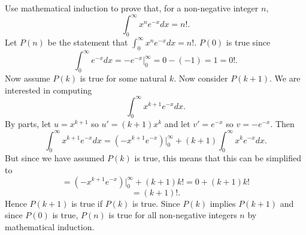 Use mathematical induction to prove that, for a non-negative integer $n$, 
\[
\int^\infty_0 x^ne^{-x} dx = n!.
\]
\newline
Let $P(n)$ be the statement that $\int^{\infty}_0 x^ne^{-x}dx = n!$. $P(0)$ is true since 
\[
\int^\infty_0 e^{-x} dx = -e^{-x}\rvert^\infty_0 = 0 - (-1) = 1 = 0!.
\]
Now assume $P(k)$ is true for some natural $k$. Now consider $P(k+1)$. We are interested in computing
\[
\int^{\infty}_0 x^{k+1}e^{-x}dx.
\]
By parts, let $u = x^{k+1}$ so $u' = (k+1)x^k$ and let $v' = e^{-x}$ so $v = -e^{-x}$. Then
\[
\int^{\infty}_0 x^{k+1}e^{-x}dx = (-x^{k+1}e^{-x})\rvert^\infty_0 + (k+1)\int^\infty_0 x^ke^{-x}dx.
\]
But since we have assumed $P(k)$ is true, this means that this can be simplified to
\[
= (-x^{k+1}e^{-x})\rvert^\infty_0 + (k+1)k! = 0 + (k+1)k!
\]
\[
= (k+1)!.
\]
Hence $P(k+1)$ is true if $P(k)$ is true. Since $P(k)$ implies $P(k+1)$ and since $P(0)$ is true, $P(n)$ is true for all non-negative integers $n$ by mathematical induction.